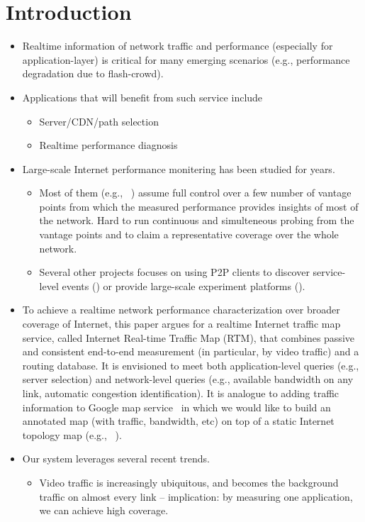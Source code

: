 \section{Introduction}
\begin{itemize}
	\item Realtime information of network traffic and performance (especially for application-layer) is critical for many emerging scenarios (e.g., performance degradation due to flash-crowd).
	\item Applications that will benefit from such service include
	\begin{itemize}
		\item Server/CDN/path selection
		\item Realtime performance diagnosis
	\end{itemize}
	\item Large-scale Internet performance monitering has been studied for years. 
	\begin{itemize}
		\item Most of them (e.g., ~\cite{ningning,iplane}) assume full control over a few number of vantage points from which the measured performance provides insights of most of the network. Hard to run continuous and simulteneous probing from the vantage points and to claim a representative coverage over the whole network. 
		\item Several other projects focuses on using P2P clients to discover service-level events (\cite{crowdsourcing}) or provide large-scale experiment platforms (\cite{dasu}).
	\end{itemize}
	\item To achieve a realtime network performance characterization over broader coverage of Internet, this paper argues for a realtime Internet traffic map service, called Internet Real-time Traffic Map (RTM), that combines passive and consistent end-to-end measurement (in particular, by video traffic) and a routing database. It is envisioned to meet both application-level queries (e.g., server selection) and network-level queries (e.g., available bandwidth on any link, automatic congestion identification). It is analogue to adding traffic information to Google map service~\cite{} in which we would like to build an annotated map (with traffic, bandwidth, etc) on top of a static Internet topology map (e.g., ~\cite{rocketfuel}).
	\item Our system leverages several recent trends. 
	\begin{itemize}
		\item Video traffic is increasingly ubiquitous, and becomes the background traffic on almost every link -- implication: by measuring one application, we can achieve high coverage. 

\end{itemize}
\end{itemize}

